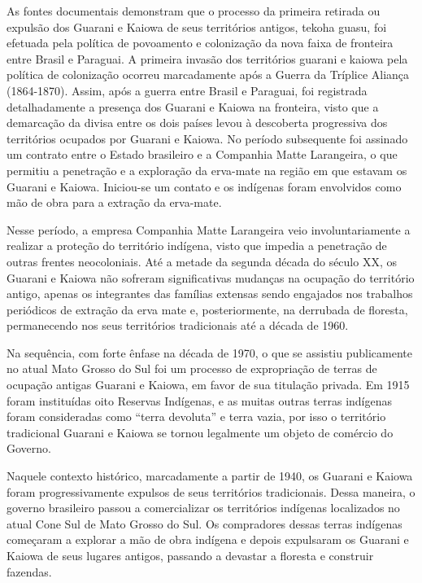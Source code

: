 \documentclass{article}
\begin{document}
As fontes documentais demonstram que o processo da primeira retirada ou
expuls\~ao dos Guarani e Kaiowa de seus territ\'orios antigos, tekoha
guasu, foi efetuada pela pol\'itica de povoamento e coloniza\c{c}\~ao
da nova faixa de fronteira entre Brasil e Paraguai. A primeira
invas\~ao dos territ\'orios guarani e kaiowa pela pol\'itica de
coloniza\c{c}\~ao ocorreu marcadamente ap\'os a Guerra da Tr\'iplice
Alian\c{c}a (1864-1870). Assim, ap\'os a guerra entre Brasil e
Paraguai, foi registrada detalhadamente a presen\c{c}a dos Guarani e
Kaiowa na fronteira, visto que a demarca\c{c}\~ao da divisa entre os
dois pa\'ises levou \`a descoberta progressiva dos territ\'orios
ocupados por Guarani e Kaiowa. No per\'iodo subsequente foi assinado um
contrato entre o Estado brasileiro e a Companhia Matte Larangeira, o
que permitiu a penetra\c{c}\~ao e a explora\c{c}\~ao da erva-mate na
regi\~ao em que estavam os Guarani e Kaiowa. Iniciou-se um contato e os
ind\'igenas foram envolvidos como m\~ao de obra para a extra\c{c}\~ao
da erva-mate.

Nesse per\'iodo, a empresa Companhia Matte Larangeira veio
involuntariamente a realizar a prote\c{c}\~ao do territ\'orio
ind\'igena, visto que impedia a penetra\c{c}\~ao de outras frentes
neocoloniais. At\'e a metade da segunda d\'ecada do s\'eculo XX, os
Guarani e Kaiowa n\~ao sofreram significativas mudan\c{c}as na
ocupa\c{c}\~ao do territ\'orio antigo, apenas os integrantes das
fam\'ilias extensas sendo engajados nos trabalhos peri\'odicos de
extra\c{c}\~ao da erva mate e, posteriormente, na derrubada de
floresta, permanecendo nos seus territ\'orios tradicionais at\'e a
d\'ecada de 1960.

Na sequ\^encia, com forte \^enfase na d\'ecada de 1970, o que se
assistiu publicamente no atual Mato Grosso do Sul foi um processo de
expropria\c{c}\~ao de terras de ocupa\c{c}\~ao antigas Guarani e
Kaiowa, em favor de sua titula\c{c}\~ao privada. Em 1915 foram
institu\'idas oito Reservas Ind\'igenas, e as muitas outras terras
ind\'igenas foram consideradas como {\textquotedblleft}terra
devoluta{\textquotedblright} e terra vazia, por isso o territ\'orio
tradicional Guarani e Kaiowa se tornou legalmente um objeto de
com\'ercio do Governo. 

Naquele contexto hist\'orico, marcadamente a partir de 1940, os Guarani
e Kaiowa foram progressivamente expulsos de seus territ\'orios
tradicionais. Dessa maneira, o governo brasileiro passou a
comercializar os territ\'orios ind\'igenas localizados no atual Cone
Sul de Mato Grosso do Sul. Os compradores dessas terras ind\'igenas
come\c{c}aram a explorar a m\~ao de obra ind\'igena e depois expulsaram
os Guarani e Kaiowa de seus lugares antigos, passando a devastar a
floresta e construir fazendas.
\end{document}
